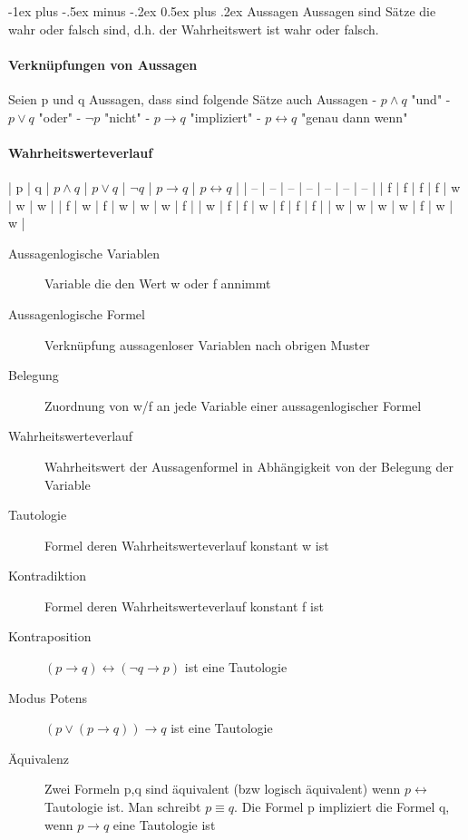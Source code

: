 \documentclass[10pt,landscape]{article}
\makeatletter
\renewcommand{\section}{\@startsection{section}{1}{0mm}%
                                {-1ex plus -.5ex minus -.2ex}%
                                {0.5ex plus .2ex}%
                                {\normalfont\large\bfseries}}
\makeatother
\begin{document}
\raggedright
\footnotesize
\begin{multicols}{3}


\setlength{\premulticols}{1pt}
\setlength{\postmulticols}{1pt}
\setlength{\multicolsep}{1pt}
\setlength{\columnsep}{2pt}

\section{Aussagen}
Aussagen sind Sätze die wahr oder falsch sind, d.h. der Wahrheitswert ist wahr oder falsch.

\paragraph{Verknüpfungen von Aussagen}
Seien p und q Aussagen, dass sind folgende Sätze auch Aussagen
- $p \wedge q$ "und"
- $p \vee q$ "oder"
- $\neg p$ "nicht"
- $p \rightarrow q$ "impliziert"
- $p \leftrightarrow q$ "genau dann wenn"

\paragraph{Wahrheitswerteverlauf}
| p | q | $p\wedge q$ | $p\vee q$ | $\neg q$ | $p\rightarrow q$ | $p\leftrightarrow q$ |
| -- | -- | -- | -- | -- | -- | -- |
| f | f | f | f | w | w | w |
| f | w | f | w | w | w | f |
| w | f | f | w | f | f | f |
| w | w | w | w | f | w | w |

\begin{description}
    \item[Aussagenlogische Variablen] Variable die den Wert w oder f annimmt
    \item[Aussagenlogische Formel] Verknüpfung aussagenloser Variablen nach obrigen Muster
    \item[Belegung] Zuordnung von w/f an jede Variable einer aussagenlogischer Formel
    \item[Wahrheitswerteverlauf] Wahrheitswert der Aussagenformel in Abhängigkeit von der Belegung der Variable
    \item[Tautologie] Formel deren Wahrheitswerteverlauf konstant w ist
    \item[Kontradiktion] Formel deren Wahrheitswerteverlauf konstant f ist
    \item[Kontraposition] $(p\rightarrow q)\leftrightarrow (\neg q \rightarrow p)$ ist eine Tautologie
    \item[Modus Potens] $(p\vee (p\rightarrow q))\rightarrow q$ ist eine Tautologie
    \item[Äquivalenz] Zwei Formeln p,q sind äquivalent (bzw logisch äquivalent) wenn $p\leftrightarrow$ Tautologie ist. Man schreibt $p \equiv q$. Die Formel p impliziert die Formel q, wenn $p\rightarrow q$ eine Tautologie ist
\end{description}


\end{multicols}
\end{document}
